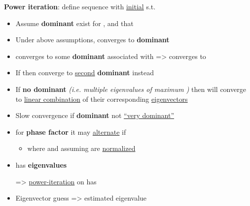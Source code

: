 \textbf{Power iteration}: define sequence
with \underline{initial}  s.t. 
\begin{itemize}
      \item
            Assume \textbf{dominant}  exist
            for , and that
      \item
            Under above assumptions,
            converges to \textbf{dominant }
      \item
             converges to some
            \textbf{dominant}  associated with
             =>
             converges to
      \item
            If 
            then 
            converge to \underline{second} \textbf{dominant}  instead
      \item
            If \textbf{no dominant \iMbox{\lambda}} \emph{(i.e. multiple
                  eigenvalues of maximum \iMbox{|\lambda|})} then
             will converge to \underline{linear combination}
            of their corresponding \underline{eigenvectors}
      \item
            Slow convergence if \textbf{dominant } not \underline{``very dominant''}
      \item
            for \textbf{phase factor}  it may \underline{alternate} if 
            \begin{itemize}

                  \item
                        where  and assuming
                         are \underline{normalized}
            \end{itemize}
      \item
             has \textbf{eigenvalues} \iMbox{\lambda-\sigma}

            => \underline{power-iteration} on  has 
      \item
            Eigenvector guess => estimated eigenvalue
\end{itemize}

